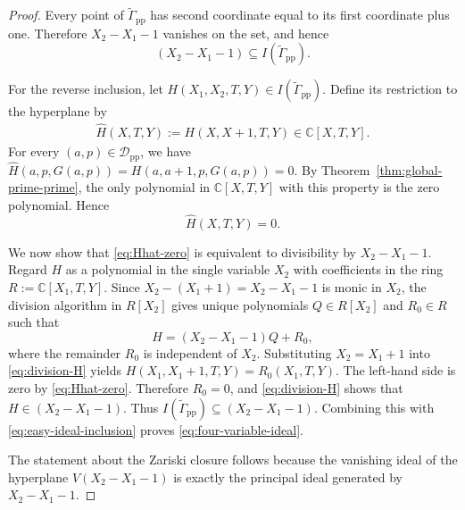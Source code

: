 \documentclass[reqno, 12pt]{article}
\numberwithin{equation}{section}
\theoremstyle{definition}
\newcommand{\CC}{\mathbb{C}}
\newcommand{\cD}{\mathcal D}
\begin{document}
\begin{proof}
Every point of $\widetilde\Gamma_{\mathrm{pp}}$ has second coordinate equal
to its first coordinate plus one.  Therefore $X_2-X_1-1$ vanishes on the set, and hence
\begin{equation}\label{eq:easy-ideal-inclusion}
 (X_2-X_1-1)\subseteq I(\widetilde\Gamma_{\mathrm{pp}}).
\end{equation}

For the reverse inclusion, let $H(X_1,X_2,T,Y)\in I(\widetilde\Gamma_{\mathrm{pp}})$.
Define its restriction to the hyperplane by
\begin{align*}
   \widehat H(X,T,Y):=H(X,X+1,T,Y)\in\CC[X,T,Y].
\end{align*}
For every $(a,p)\in\cD_{\mathrm{pp}}$, we have $\widehat H(a,p,G(a,p))=H(a,a+1,p,G(a,p))=0$.
By Theorem~\ref{thm:global-prime-prime}, the only polynomial in
$\CC[X,T,Y]$ with this property is the zero polynomial.  Hence
\begin{equation}\label{eq:Hhat-zero}
   \widehat H(X,T,Y)=0.
\end{equation}

We now show that \cref{eq:Hhat-zero} is equivalent to divisibility by
$X_2-X_1-1$.  Regard $H$ as a polynomial in the single variable $X_2$ with
coefficients in the ring $R:=\CC[X_1,T,Y]$.
Since $X_2-(X_1+1)=X_2-X_1-1$ is monic in $X_2$, the division algorithm in $R[X_2]$ gives unique
polynomials $Q\in R[X_2]$ and $R_0\in R$ such that
\begin{equation}\label{eq:division-H}
   H=(X_2-X_1-1)Q+R_0,
\end{equation}
where the remainder $R_0$ is independent of $X_2$.  Substituting
$X_2=X_1+1$ into \cref{eq:division-H} yields $H(X_1,X_1+1,T,Y)=R_0(X_1,T,Y)$.
The left-hand side is zero by \cref{eq:Hhat-zero}.  Therefore $R_0=0$, and
\cref{eq:division-H} shows that $H\in(X_2-X_1-1)$.
Thus $I(\widetilde\Gamma_{\mathrm{pp}})\subseteq(X_2-X_1-1)$.
Combining this with \cref{eq:easy-ideal-inclusion} proves \cref{eq:four-variable-ideal}.

The statement about the Zariski closure follows because the vanishing ideal of the hyperplane $V(X_2-X_1-1)$ is exactly the principal ideal generated by $X_2-X_1-1$.
\end{proof}
\end{document}

